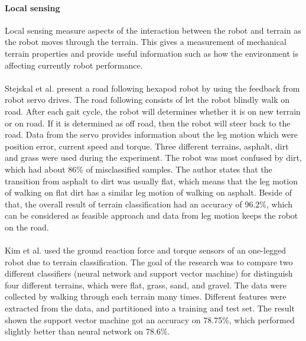 \documentclass[USenglish]{ifimaster}  %
\begin{document}
\paragraph{Local sensing}
Local sensing measure aspects of the interaction between the robot and terrain as the robot moves through the terrain. This gives a measurement of mechanical terrain properties and provide useful information such as how the environment is affecting currently robot performance. 
\\
\\ 
Stejskal et al. \cite{7487544} present a road following hexapod robot by using the feedback from robot servo drives. The road following consists of let the robot blindly walk on road. After each gait cycle, the robot will determines whether it is on new terrain or on road. If it is determined as off road, then the robot will steer back to the road. Data from the servo provides information about the leg motion which were position error, current speed and torque. Three different terrains, asphalt, dirt and grass were used during the experiment. The robot was most confused by dirt, which had about 86\% of misclassified samples. The author states that the transition from asphalt to dirt was usually flat, which means that the leg motion of walking on flat dirt has a similar leg motion of walking on asphalt. Beside of that, the overall result of terrain classification had an accuracy of 96.2\%, which can be considered as feasible approach and data from leg motion keeps the robot on the road.
\\
\\
Kim et al. \cite{5602459} used the ground reaction force and torque sensors of an one-legged robot due to terrain classification. The goal of the research was to compare two different classifiers (neural network and support vector machine) for distinguish four different terrains, which were flat, grass, sand, and gravel. The data were collected by walking through each terrain many times. Different features were extracted from the data, and partitioned into a training and test set. The result shown the support vector machine got an accuracy on 78.75\%, which performed slightly better than neural network on 78.6\%.
\\
\\
\end{document}

